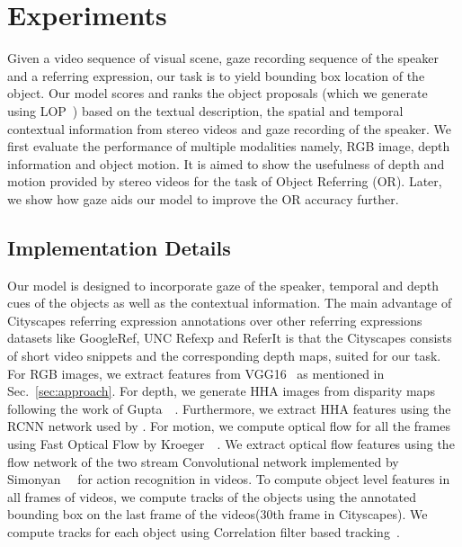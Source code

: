 \documentclass[10pt,twocolumn,letterpaper]{article}
\begin{document}
\section{Experiments}
\label{sec:experiment}

Given a video sequence of visual scene, gaze recording sequence of the speaker and a referring expression, our task is to yield bounding box location of the object. 
Our model scores and ranks the object proposals (which we generate using LOP~\cite{vasudevan2017chi}) based on the textual description, the spatial and temporal contextual information from stereo videos and gaze recording of the speaker. We first evaluate the performance of multiple modalities namely, RGB image, depth information and object motion. It is aimed to show the usefulness of depth and motion provided by stereo videos for the task of Object Referring (OR). Later, we show how gaze aids our model to improve the OR accuracy further.

\subsection{Implementation Details}
Our model is designed to incorporate gaze of the speaker, temporal and depth cues of the objects as well as the contextual information. The main advantage of Cityscapes referring expression annotations over other referring expressions datasets like GoogleRef, UNC Refexp and ReferIt is that the Cityscapes consists of short video snippets and the corresponding depth maps, suited for our task. For RGB images, we extract features from VGG16~\cite{vgg16} as mentioned in Sec.~\ref{sec:approach}. For depth, we generate HHA images from disparity maps following the work of Gupta~\etal~\cite{rgbd:net:eccv14}. Furthermore, we extract HHA features using the RCNN network used by \cite{rgbd:net:eccv14}. For motion, we compute optical flow for all the frames using Fast Optical Flow by Kroeger~\etal~\cite{kroeger2016fast}. We extract optical flow features using the flow network of the two stream Convolutional network implemented by Simonyan~\etal~\cite{two:stream:nips14} for action recognition in videos. To compute object level features in all frames of videos, we compute tracks of the objects using the annotated bounding box on the last frame of the videos(30th frame in Cityscapes). We compute tracks for each object using Correlation filter based tracking~\cite{valmadre2017end}. 
\end{document}
